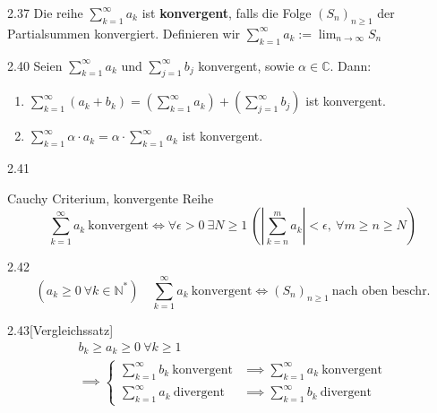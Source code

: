 \documentclass[8pt,a4paper,twocolumn,table]{extarticle}
\newcommand{\N}{\mathbb{N}}
\newcommand{\seq}[1]{\left( #1_n \right)_{n \ge 1}}
\begin{document}
\begin{definition}{2.37}
    Die reihe $\sum_{k = 1}^{\infty} a_k$ ist \textbf{konvergent}, falls die Folge $\seq{S}$ der Partialsummen konvergiert.
    Definieren wir $\sum_{k = 1}^{\infty} a_k := \lim_{n \to \infty} S_n$
\end{definition}

\begin{satz}{2.40}
    Seien $\sum_{k=1}^{\infty} a_k$ und $\sum_{j=1}^{\infty} b_j$ konvergent, sowie $\alpha \in \mathbb{C}$.
    Dann:
    \begin{enumerate}
        \item $\sum_{k=1}^{\infty} (a_k + b_k) = \left( \sum_{k=1}^{\infty} a_k \right) + \left( \sum_{j=1}^{\infty} b_j \right)$ ist konvergent.
        \item $\sum_{k=1}^{\infty} \alpha \cdot a_k = \alpha \cdot \sum_{k=1}^{\infty} a_k$ ist konvergent.
    \end{enumerate}
\end{satz}

\begin{satz}{2.41}
    \label{satz:cauchy-criterium-reihe}
    \par Cauchy Criterium, konvergente Reihe
    \[
        \sum_{k=1}^\infty a_k\ \mbox{konvergent}
        \iff
        \forall \epsilon > 0\ \exists N \ge 1\ \left( \left| \sum_{k=n}^m a_k \right| < \epsilon,\ \forall m \ge n \ge N \right)
    \]
\end{satz}

\begin{satz}{2.42}
    \[
        (a_k \ge 0\ \forall k \in \N^*)
        \quad
        \sum_{k=1}^\infty a_k\ \mbox{konvergent}
        \iff
        \seq{S}\ \mbox{nach oben beschr.}
    \]
\end{satz}

\begin{korollar}{2.43}[Vergleichssatz]
    \begin{align*}
        b_k \ge a_k \ge 0\ \forall k \ge 1 \\
        \implies \begin{cases}
            \sum_{k=1}^\infty b_k\ \mbox{konvergent} & \implies \sum_{k=1}^\infty a_k\ \mbox{konvergent} \\
            \sum_{k=1}^\infty a_k\ \mbox{divergent}  & \implies \sum_{k=1}^\infty b_k\ \mbox{divergent}
        \end{cases}
    \end{align*}
\end{korollar}
\end{document}
